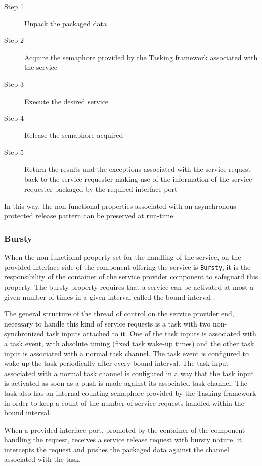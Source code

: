\begin{description}
\item [Step 1] Unpack the packaged data
\item [Step 2] Acquire the semaphore provided by the Tasking framework associated with the service
\item [Step 3] Execute the desired service
\item [Step 4] Release the semaphore acquired 
\item [Step 5] Return the results and the exceptions associated with the service request back to the service requester making use of the information of the service requester packaged by the required interface port 
\end{description}

In this way, the non-functional properties associated with an asynchronous protected release pattern can be preserved at run-time.

\subsubsection{\textbf{Bursty}}
When the non-functional property set for the handling of the service, on the provided interface side of the component offering the service is \texttt{Bursty}, it is the responsibility of the container of the service provider component to safeguard this property. The bursty property requires that a service can be activated at most a given number of times in a given interval called the bound interval \cite{SpecMetamodel,CompBasedProcess}.

The general structure of the thread of control on the service provider end, necessary to handle this kind of service requests is a task with two non-synchronized task inputs attached to it. One of the task inputs is associated with a task event, with absolute timing (fixed task wake-up times) and the other task input is associated with a normal task channel. The task event is configured to wake up the task periodically after every bound interval. The task input associated with a normal task channel is configured in a way that the task input is activated as soon as a push is made against its associated task channel. The task also has an internal counting semaphore provided by the Tasking framework in order to keep a count of the number of service requests handled within the bound interval.

When a provided interface port, promoted by the container of the component handling the request, receives a service release request with bursty nature, it intercepts the request and pushes the packaged data against the channel associated with the task.
  
